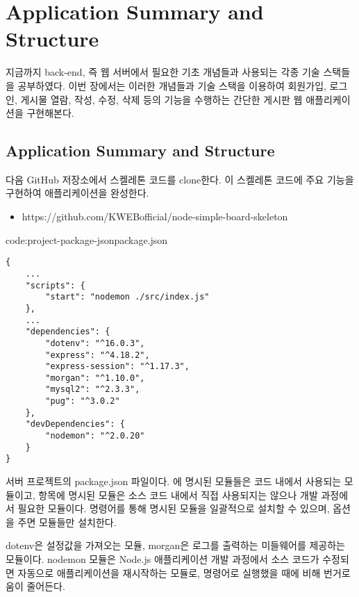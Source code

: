 \section{Application Summary and Structure}\label{sect:web-app-summary}

지금까지 back-end, 즉 웹 서버에서 필요한 기초 개념들과 사용되는 각종 기술 스택들을 공부하였다. 이번 장에서는 이러한 개념들과 기술 스택을 이용하여 회원가입, 로그인, 게시물 열람, 작성, 수정, 삭제 등의 기능을 수행하는 간단한 게시판 웹 애플리케이션을 구현해본다.

\subsection*{Application Summary and Structure}

다음 GitHub 저장소에서 스켈레톤 코드를 clone한다. 이 스켈레톤 코드에 주요 기능을 구현하여 애플리케이션을 완성한다.

\begin{itemize}
    \item https://github.com/KWEBofficial/node-simple-board-skeleton
\end{itemize}

\begin{code}{code:project-package-json}{package.json}
\begin{verbatim}
{
    ...
    "scripts": {
        "start": "nodemon ./src/index.js"
    },
    ...
    "dependencies": {
        "dotenv": "^16.0.3",
        "express": "^4.18.2",
        "express-session": "^1.17.3",
        "morgan": "^1.10.0",
        "mysql2": "^2.3.3",
        "pug": "^3.0.2"
    },
    "devDependencies": {
        "nodemon": "^2.0.20"
    }
}
\end{verbatim}
\end{code}

\은 서버 프로젝트의 package.json 파일이다. 에 명시된 모듈들은 코드 내에서 사용되는 모듈이고,  항목에 명시된 모듈은 소스 코드 내에서 직접 사용되지는 않으나 개발 과정에서 필요한 모듈이다.  명령어를 통해 명시된 모듈을 일괄적으로 설치할 수 있으며,  옵션을 주면  모듈들만 설치한다.

dotenv은 설정값을 가져오는 모듈, morgan은 로그를 출력하는 미들웨어를 제공하는 모듈이다. nodemon 모듈은 Node.js 애플리케이션 개발 과정에서 소스 코드가 수정되면 자동으로 애플리케이션을 재시작하는 모듈로,  명령어로 실행했을 때에 비해 번거로움이 줄어든다.

